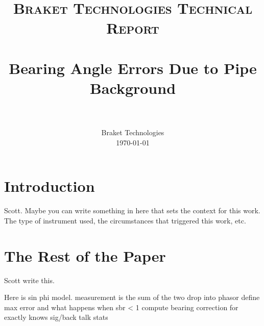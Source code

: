 \documentclass[paper=a4, fontsize=11pt]{scrartcl}
\title{
		\usefont{OT1}{bch}{b}{n}
		\normalfont \normalsize \textsc{Braket Technologies Technical Report} \\ [25pt]
		\horrule{0.5pt} \\[0.4cm]
		\huge Bearing Angle Errors Due to Pipe Background \\
		\horrule{2pt} \\[0.5cm]
}
\author{
		\normalfont 								\normalsize
        Braket Technologies\\[-3pt]		\normalsize
        \today
}
\date{}
\numberwithin{equation}{section}		%
\numberwithin{figure}{section}			%
\numberwithin{table}{section}				%
\begin{document}
\maketitle
\section{Introduction}
Scott.  Maybe you can write something in here that sets the context for this work.  The type of instrument used, the circumstances that triggered this work, etc.

\section{The Rest of the Paper}
Scott write this.

Here is sin phi model.
measurement is the sum of the two
drop into phasor
define max error and what happens when sbr < 1
compute bearing correction for exactly knows sig/back
talk stats
\end{document}
